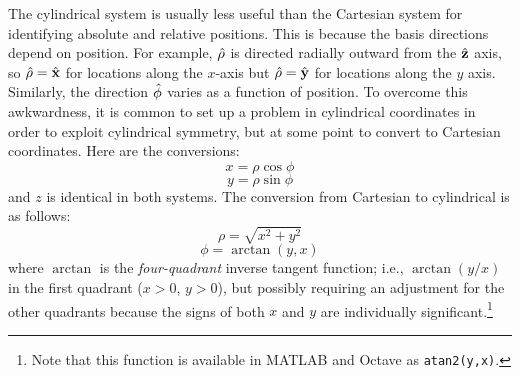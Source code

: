The cylindrical system is usually less useful than the Cartesian system for identifying absolute and relative positions.
This is because the basis directions depend on position.
For example, $\hat{\bf \rho}$ is directed radially outward from the $\hat{\bf z}$ axis, so $\hat{\bf \rho}=\hat{\bf x}$ for locations along the $x$-axis but $\hat{\bf \rho}=\hat{\bf y}$ for locations along the $y$ axis.
Similarly, the direction $\hat{\bf \phi}$ varies as a function of position.
To overcome this awkwardness, it is common to set up a problem in cylindrical coordinates in order to exploit cylindrical symmetry, but at some point to convert to Cartesian coordinates.  
Here are the conversions:
%
\begin{equation}
x = \rho\cos\phi
\end{equation}
%
\begin{equation}
y = \rho\sin\phi
\end{equation}
%
and $z$ is identical in both systems.  The conversion from Cartesian to cylindrical is as follows:
%
\begin{equation}
\rho = \sqrt{x^2+y^2}
\end{equation}
%
\begin{equation}
\phi = \arctan\left(y,x\right)
\end{equation}
%
where $\arctan$ is the \emph{four-quadrant} inverse tangent function; i.e., $\arctan(y/x)$ in the first quadrant ($x>0$, $y>0$), but possibly requiring an adjustment for the other quadrants because the signs of both $x$ and $y$ are individually significant.\footnote{Note that this function is available in MATLAB and Octave as {\tt atan2(y,x)}.}

